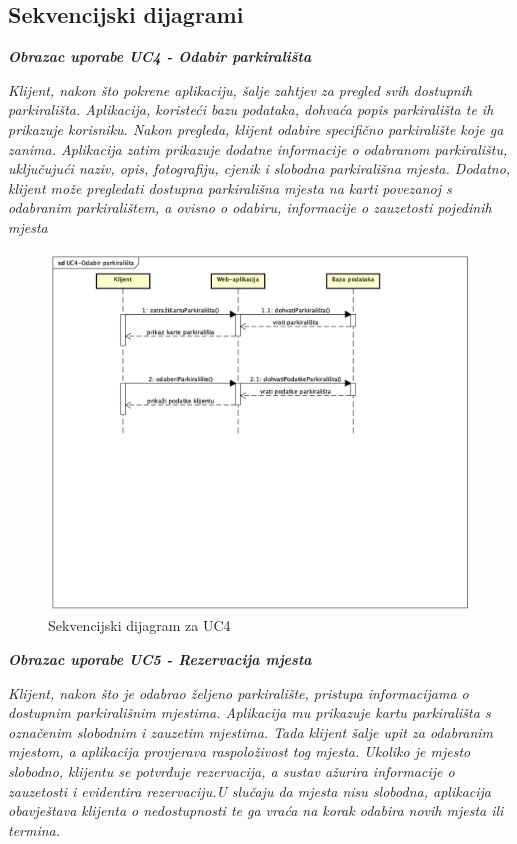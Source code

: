 				
			\subsection{Sekvencijski dijagrami}
				
				 \textbf{\textit{Obrazac uporabe UC4 - Odabir parkirališta}}
				  
				
				 \textit{Klijent, nakon što pokrene aplikaciju, šalje zahtjev za pregled svih dostupnih parkirališta. Aplikacija, koristeći bazu podataka, dohvaća popis parkirališta te ih prikazuje korisniku. Nakon pregleda, klijent odabire specifično parkiralište koje ga zanima. Aplikacija zatim prikazuje dodatne informacije o odabranom parkiralištu, uključujući naziv, opis, fotografiju, cjenik i slobodna parkirališna mjesta. Dodatno, klijent može pregledati dostupna parkirališna mjesta na karti povezanoj s odabranim parkiralištem, a ovisno o odabiru, informacije o zauzetosti pojedinih mjesta}
				    
				       \begin{figure}[hbt!]
				    	   \centering
				    	   \includegraphics[width=0.7\linewidth]{slike/uc4.png}
				    	   \caption{Sekvencijski dijagram za UC4}
				        	\label{fig:uc4}
				       \end{figure}
				    
				    
				    
				    
				    
				    
				   \textbf{\textit{Obrazac uporabe UC5 - Rezervacija mjesta}}
				   
				   
				  
				   \textit{Klijent, nakon što je odabrao željeno parkiralište, pristupa informacijama o dostupnim parkirališnim mjestima. Aplikacija mu prikazuje kartu parkirališta s označenim slobodnim i zauzetim mjestima. Tada klijent šalje upit za odabranim mjestom, a aplikacija provjerava raspoloživost tog mjesta. Ukoliko je mjesto slobodno, klijentu se potvrđuje rezervacija, a sustav ažurira informacije o zauzetosti i evidentira rezervaciju.U slučaju da mjesta nisu slobodna, aplikacija obavještava klijenta o nedostupnosti te ga vraća na korak odabira novih mjesta ili termina.}
				   
